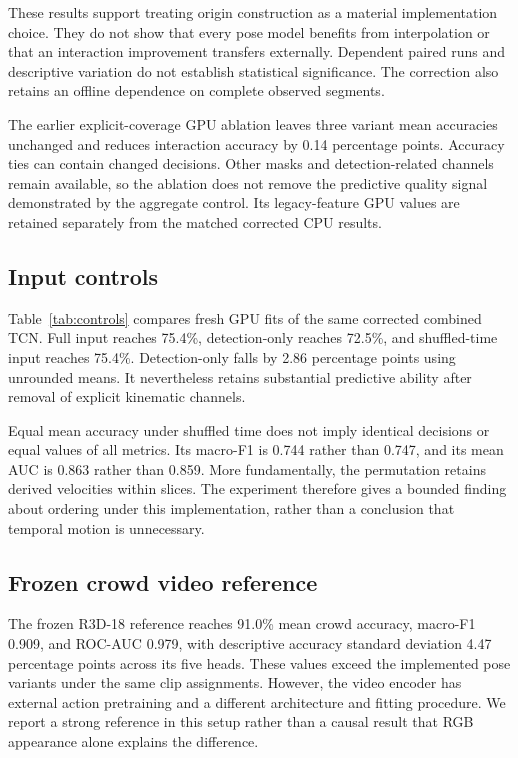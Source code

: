 These results support treating origin construction as a material implementation choice. They do not show that every pose model benefits from interpolation or that an interaction improvement transfers externally. Dependent paired runs and descriptive variation do not establish statistical significance. The correction also retains an offline dependence on complete observed segments.


The earlier explicit-coverage GPU ablation leaves three variant mean accuracies unchanged and reduces interaction accuracy by 0.14 percentage points. Accuracy ties can contain changed decisions. Other masks and detection-related channels remain available, so the ablation does not remove the predictive quality signal demonstrated by the aggregate control. Its legacy-feature GPU values are retained separately from the matched corrected CPU results.

\subsection{Input controls}
Table~\ref{tab:controls} compares fresh GPU fits of the same corrected combined TCN. Full input reaches 75.4\%, detection-only reaches 72.5\%, and shuffled-time input reaches 75.4\%. Detection-only falls by 2.86 percentage points using unrounded means. It nevertheless retains substantial predictive ability after removal of explicit kinematic channels.

Equal mean accuracy under shuffled time does not imply identical decisions or equal values of all metrics. Its macro-F1 is 0.744 rather than 0.747, and its mean AUC is 0.863 rather than 0.859. More fundamentally, the permutation retains derived velocities within slices. The experiment therefore gives a bounded finding about ordering under this implementation, rather than a conclusion that temporal motion is unnecessary.



\subsection{Frozen crowd video reference}
The frozen R3D-18 reference reaches 91.0\% mean crowd accuracy, macro-F1 0.909, and ROC-AUC 0.979, with descriptive accuracy standard deviation 4.47 percentage points across its five heads. These values exceed the implemented pose variants under the same clip assignments. However, the video encoder has external action pretraining and a different architecture and fitting procedure. We report a strong reference in this setup rather than a causal result that RGB appearance alone explains the difference.

